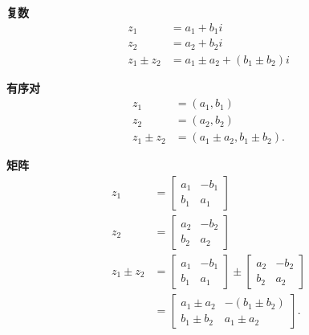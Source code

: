 \begin{tcolorbox}[breakable, enhanced,title = {加减法}]
  \textbf{复数}
  $$
    \begin{aligned}
      z_{1}           & =a_{1}+b_{1} i                                  \\
      z_{2}           & =a_{2}+b_{2} i                                  \\
      z_{1} \pm z_{2} & =a_{1} \pm a_{2}+\left(b_{1} \pm b_{2}\right) i
    \end{aligned}
  $$

  \textbf{有序对}
  $$
    \begin{aligned}
      z_{1}           & =\left(a_{1}, b_{1}\right)                       \\
      z_{2}           & =\left(a_{2}, b_{2}\right)                       \\
      z_{1} \pm z_{2} & =\left(a_{1} \pm a_{2}, b_{1} \pm b_{2}\right) .
    \end{aligned}
  $$

  \textbf{矩阵}
  $$
    \begin{aligned}
      z_{1}           & =\left[\begin{array}{ll}
          a_{1} & -b_{1} \\
          b_{1} & a_{1}
        \end{array}\right]                                             \\
      z_{2}           & =\left[\begin{array}{cc}
          a_{2} & -b_{2} \\
          b_{2} & a_{2}
        \end{array}\right]                                             \\
      z_{1} \pm z_{2} & =\left[\begin{array}{cc}
          a_{1} & -b_{1} \\
          b_{1} & a_{1}
        \end{array}\right] \pm\left[\begin{array}{cc}
          a_{2} & -b_{2} \\
          b_{2} & a_{2}
        \end{array}\right] \\
                      & =\left[\begin{array}{cc}
          a_{1} \pm a_{2} & -\left(b_{1} \pm b_{2}\right) \\
          b_{1} \pm b_{2} & a_{1} \pm a_{2}
        \end{array}\right] .
    \end{aligned}
  $$
\end{tcolorbox}


